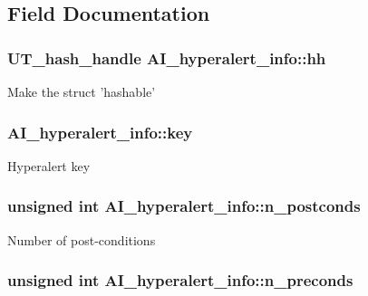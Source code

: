 \subsection{Field Documentation}
\hypertarget{structAI__hyperalert__info_a6915bec67d383f374e758b44f50b48ff}{
\subsubsection[{hh}]{\setlength{\rightskip}{0pt plus 5cm}UT\_\-hash\_\-handle {\bf AI\_\-hyperalert\_\-info::hh}}}
\label{structAI__hyperalert__info_a6915bec67d383f374e758b44f50b48ff}
Make the struct 'hashable' \hypertarget{structAI__hyperalert__info_a9d461da8f00415ef03b24edb3bbd6cf8}{
\subsubsection[{key}]{ {\bf AI\_\-hyperalert\_\-info::key}}}
\label{structAI__hyperalert__info_a9d461da8f00415ef03b24edb3bbd6cf8}
Hyperalert key \hypertarget{structAI__hyperalert__info_a73322b6cad3e883abed03b62c6c21719}{
\subsubsection[{n\_\-postconds}]{\setlength{\rightskip}{0pt plus 5cm}unsigned int {\bf AI\_\-hyperalert\_\-info::n\_\-postconds}}}
\label{structAI__hyperalert__info_a73322b6cad3e883abed03b62c6c21719}
Number of post-\/conditions \hypertarget{structAI__hyperalert__info_a616c16f364dbb2d726e88df6b364ea40}{
\subsubsection[{n\_\-preconds}]{\setlength{\rightskip}{0pt plus 5cm}unsigned int {\bf AI\_\-hyperalert\_\-info::n\_\-preconds}}}
\label{structAI__hyperalert__info_a616c16f364dbb2d726e88df6b364ea40}
